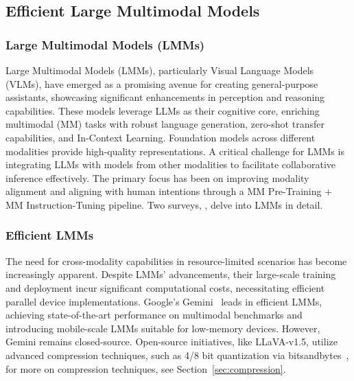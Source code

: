 \subsection{Efficient Large Multimodal Models}

\subsubsection{Large Multimodal Models (LMMs)}
Large Multimodal Models (LMMs), particularly Visual Language Models (VLMs), have emerged as a promising avenue for creating general-purpose assistants, showcasing significant enhancements in perception and reasoning capabilities. These models leverage LLMs as their cognitive core, enriching multimodal (MM) tasks with robust language generation, zero-shot transfer capabilities, and In-Context Learning. Foundation models across different modalities provide high-quality representations. A critical challenge for LMMs is integrating LLMs with models from other modalities to facilitate collaborative inference effectively. The primary focus has been on improving modality alignment and aligning with human intentions through a MM Pre-Training + MM Instruction-Tuning pipeline. Two surveys, \citep{yin2023survey,zhang2024mm}, delve into LMMs in detail.

 

\subsubsection{Efficient LMMs}

The need for cross-modality capabilities in resource-limited scenarios has become increasingly apparent. Despite LMMs' advancements, their large-scale training and deployment incur significant computational costs, necessitating efficient parallel device implementations. Google's Gemini~\citep{team2023gemini} leads in efficient LMMs, achieving state-of-the-art performance on multimodal benchmarks and introducing mobile-scale LMMs suitable for low-memory devices. However, Gemini remains closed-source. Open-source initiatives, like LLaVA-v1.5, utilize advanced compression techniques, such as 4/8 bit quantization via bitsandbytes~\citep{dettmers2022llm}, for more on compression techniques, see Section~\ref{sec:compression}.

